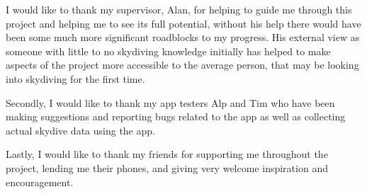 \begin{acknowledgements}
  I would like to thank my supervisor, Alan, for helping to guide me through this project and helping me to see its full potential, without his help there would have been some much more significant roadblocks to my progress. His external view as someone with little to no skydiving knowledge initially has helped to make aspects of the project more accessible to the average person, that may be looking into skydiving for the first time.

  Secondly, I would like to thank my app testers Alp and Tim who have been making suggestions and reporting bugs related to the app as well as collecting actual skydive data using the app.

  Lastly, I would like to thank my friends for supporting me throughout the project, lending me their phones, and giving very welcome inspiration and encouragement.
\end{acknowledgements}
